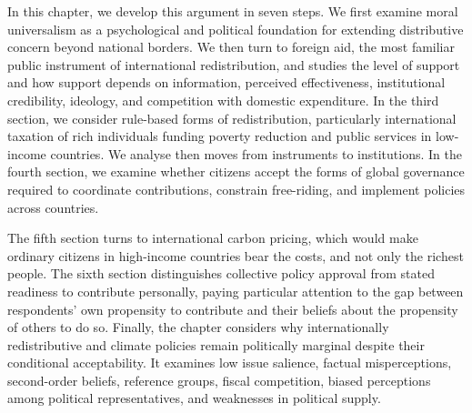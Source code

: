 In this chapter, we develop this argument in seven steps. We first examine moral universalism as a psychological and political foundation for extending distributive concern beyond national borders. We then turn to foreign aid, the most familiar public instrument of international redistribution, and studies 
the level of support and how support depends on information, perceived effectiveness, institutional credibility, ideology, and competition with domestic expenditure. In the third section, we consider rule-based forms of redistribution, particularly international taxation of rich individuals funding poverty reduction and public services in low-income countries.
We analyse then moves from instruments to institutions. In the fourth section, we examine whether citizens accept the forms of global governance required to coordinate contributions, constrain free-riding, and implement policies across countries. 

The fifth section turns to international carbon pricing, which would make ordinary citizens in high-income countries bear the costs, and not only the richest people. The sixth section distinguishes collective policy approval from stated readiness to contribute personally, paying particular attention to the gap between respondents’ own propensity to contribute and their beliefs about the propensity of others to do so. 
Finally, the chapter considers why internationally redistributive and climate policies remain politically marginal despite their conditional acceptability. It examines low issue salience, factual misperceptions, second-order beliefs, reference groups, fiscal competition, biased perceptions among political representatives, and weaknesses in political supply.

